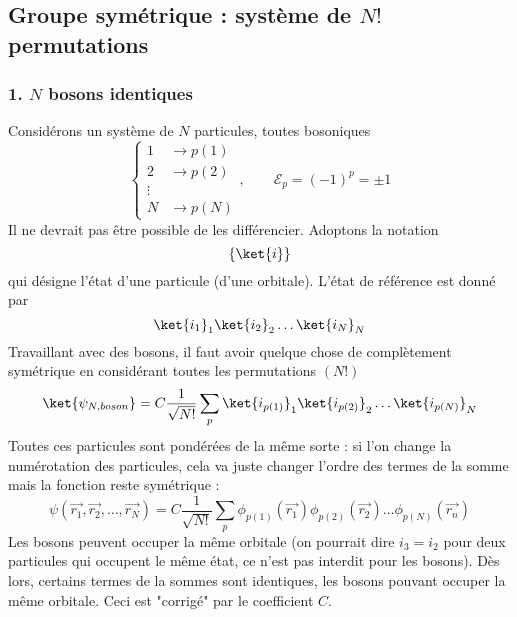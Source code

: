 \subsection{Groupe symétrique : système de $N!$ permutations}
\subsubsection{1. $N$ bosons identiques}
Considérons un système de $N$ particules, toutes bosoniques
\begin{equation}
\left\{\begin{array}{ll}
1 &\to p(1)\\
2 &\to p(2)\\
\vdots\\
N &\to p(N)
\end{array}\right.,\qquad \mathcal{E}_p = (-1)^p = \pm1
\end{equation}
Il ne devrait pas être possible de les différencier. Adoptons la notation
\begin{equation}
\{\ket{i}\}
\end{equation}
qui désigne l'état d'une particule (d'une orbitale). L'état de référence est donné par
\begin{equation}
\ket{i_1}_1\ket{i_2}_2\dots\ket{i_N}_N
\end{equation}
Travaillant avec des bosons, il faut avoir quelque chose de complètement symétrique en considérant toutes les 
permutations $(N!)$
\begin{equation}
\ket{\psi_{N,boson}} = C\frac{1}{\sqrt{N!}}\sum_p\ket{i_{p(1)}}_1\ket{i_{p(2)}}_2\dots\ket{i_{p(N)}}_N
\end{equation}
Toutes ces particules sont pondérées de la même sorte : si l'on change la numérotation des particules, cela va 
juste changer l'ordre des termes de la somme mais la fonction reste symétrique :
\begin{equation}
\psi(\vec{r_1},\vec{r_2},\dots,\vec{r_N}) = C\frac{1}{\sqrt{N!}}\sum_p \phi_{p(1)}(\vec{r_1})\phi_{p(2)}(\vec{r_2})\dots 
\phi_{p(N)}(\vec{r_n})
\end{equation}
Les bosons peuvent occuper la même orbitale (on pourrait dire $i_3=i_2$ pour deux particules qui occupent le même état, 
ce n'est pas interdit pour les bosons). Dès lors, certains termes de la sommes sont identiques, les bosons pouvant 
occuper la même orbitale. Ceci est "corrigé" par le coefficient $C$.

